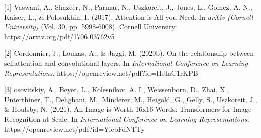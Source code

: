\documentclass{article} %
\begin{document}
\small{


[1] Vaswani, A., Shazeer, N., Parmar, N., Uszkoreit, J., Jones, L., 
Gomez, A. N., Kaiser, L., \& Polosukhin, I. (2017). Attention is All 
you Need. In {\it arXiv (Cornell University)} (Vol. 30, pp. 5998-6008). 
Cornell University. https://arxiv.org/pdf/1706.03762v5

[2] Cordonnier, J., Loukas, A., \& Jaggi, M. (2020b). On the 
relationship between selfattention and convolutional layers. In {\it International 
Conference on Learning Representations.} https://openreview.net/pdf?id=HJlnC1rKPB

[3] osovitskiy, A., Beyer, L., Kolesnikov, A. I., Weissenborn, D., Zhai, X., 
Unterthiner, T., Dehghani, M., Minderer, M., Heigold, G., Gelly, S., Uszkoreit, 
J., \& Houlsby, N. (2021). An Image is Worth 16x16 Words: Transformers for Image 
Recognition at Scale. In {\it International Conference on Learning Representations.}
https://openreview.net/pdf?id=YicbFdNTTy

}
\end{document}
